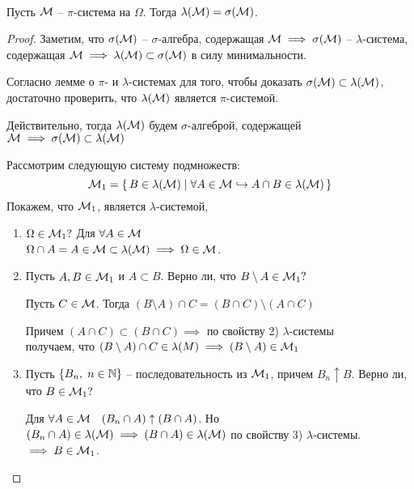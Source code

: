 \begin{theorem}~

	Пусть $\mathcal{M}$ -- $\pi$-система на $\Omega$. Тогда $\lambda(\mathcal{M}) = \sigma(\mathcal{M})$.

\end{theorem}

\begin{proof}
	Заметим, что $\sigma(\mathcal{M})$ -- $\sigma$-алгебра, содержащая $\mathcal{M} \implies \sigma(\mathcal{M})$ -- 
	$\lambda$-система, содержащая $\mathcal{M} \implies \lambda(\mathcal{M}) \subset \sigma(\mathcal{M})$ 
	в силу минимальности.
	
	Согласно лемме о $\pi$- и $\lambda$-системах для того, чтобы доказать 
	$\sigma(\mathcal{M}) \subset \lambda(\mathcal{M})$, достаточно проверить, что $\lambda(\mathcal{M})$ 
	является $\pi$-системой.
	
	Действительно, тогда $\lambda(\mathcal{M})$  будем $\sigma$-алгеброй, 
	содержащей $\mathcal{M} \implies \sigma(\mathcal{M}) \subset \lambda(\mathcal{M})$
	
	Рассмотрим следующую систему подмножеств:
	\begin{equation*}
		\mathcal{M}_1 = \left\{ \,  B \in \lambda(\mathcal{M}) \mid \forall A \in \mathcal{M} \hookrightarrow A \cap B \in \lambda(\mathcal{M}) \, \right\}
	\end{equation*}
	Покажем, что $\mathcal{M}_1$, является $\lambda$-системой,
	
	\begin{enumerate}
		\item 
			$\Omega \in \mathcal{M}_1 ?$ Для $\forall A \in \mathcal{M}$\\
			$\Omega \cap A = A \in \mathcal{M} \subset \lambda(\mathcal{M}) \implies \Omega \in \mathcal{M}$.
		
		\item 
			Пусть $A, B \in \mathcal{M}_1$ и $A \subset B$. 
			Верно ли, что $B \setminus A \in \mathcal{M}_1 ?$

			Пусть $C \in \mathcal{M}$. Тогда $(B \setminus A) \cap C = (B \cap C) \setminus (A \cap C)$

			Причем $(A \cap C) \subset (B \cap C) \implies$ по свойству 2) $\lambda$-системы\\
			получаем, что $(B \setminus A) \cap C \in \lambda(M) \implies (B \setminus A) \in \mathcal{M}_1$
			
		\item 
			Пусть $\left\{ B_n,\; n \in \mathbb{N} \right\}$ -- последовательность из $\mathcal{M}_1$, 
			причем $B_n \uparrow B$. Верно ли, что $B \in \mathcal{M}_1 ?$

			Для $\forall A \in \mathcal{M} \quad (B_n \cap A) \uparrow (B \cap A)$. 
			Но $(B_n \cap A) \in \lambda(\mathcal{M}) \implies (B \cap A) \in \lambda(\mathcal{M})$ 
			по свойству 3) $\lambda$-системы. $\implies B \in \mathcal{M}_1$.


\end{enumerate}
\end{proof}
